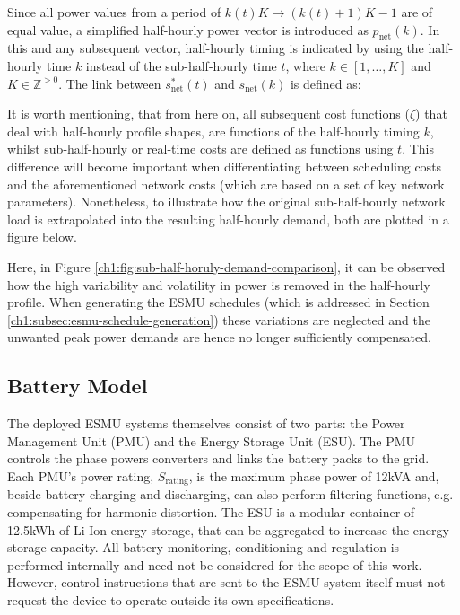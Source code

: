 

Since all power values from a period of $k(t)K \rightarrow (k(t)+1)K-1$ are of equal value, a simplified half-hourly power vector is introduced as $p_\text{net}(k)$. 
In this and any subsequent vector, half-hourly timing is indicated by using the half-hourly time $k$ instead of the sub-half-hourly time $t$, where $k \in [1, \dots, K]$ and $K \in \mathbb{Z}^{>0}$.
The link between $s^{*}_\text{net}(t)$ and $s_\text{net}(k)$ is defined as:



It is worth mentioning, that from here on, all subsequent cost functions ($\zeta$) that deal with half-hourly profile shapes, are functions of the half-hourly timing $k$, whilst sub-half-hourly or real-time costs are defined as functions using $t$.
This difference will become important when differentiating between scheduling costs and the aforementioned network costs (which are based on a set of key network parameters).
Nonetheless, to illustrate how the original sub-half-hourly network load is extrapolated into the resulting half-hourly demand, both are plotted in a figure below.



Here, in Figure \ref{ch1:fig:sub-half-horuly-demand-comparison}, it can be observed how the high variability and volatility in power is removed in the half-hourly profile.
When generating the ESMU schedules (which is addressed in Section \ref{ch1:subsec:esmu-schedule-generation}) these variations are neglected and the unwanted peak power demands are hence no longer sufficiently compensated.

\subsection{Battery Model}


The deployed ESMU systems themselves consist of two parts: the Power Management Unit (PMU) and the Energy Storage Unit (ESU).
The PMU controls the phase powers converters and links the battery packs to the grid.
Each PMU's power rating, $S_\text{rating}$, is the maximum phase power of 12kVA and, beside battery charging and discharging, can also perform filtering functions, e.g. compensating for  harmonic distortion.
The ESU is a modular container of 12.5kWh of Li-Ion energy storage, that can be aggregated to increase the energy storage capacity.
All battery monitoring, conditioning and regulation is performed internally and need not be considered for the scope of this work.
However, control instructions that are sent to the ESMU system itself must not request the device to operate outside its own specifications.

